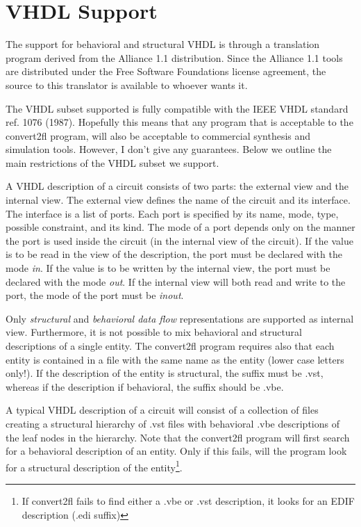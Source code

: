 \section{VHDL Support}
\label{VHDL}

The support for behavioral and structural VHDL%
%
{} is through a translation
program derived from the Alliance%
%
{} 1.1 distribution. 
Since the Alliance 1.1 tools are distributed under the Free Software
Foundations license agreement, the source to this translator is
available to whoever wants it.

The VHDL subset supported is fully compatible with the IEEE VHDL standard
ref. 1076 (1987).
Hopefully this means that any program that is acceptable to the convert2fl%
%
{}
program, will also be acceptable to commercial synthesis and simulation tools. 
However, I don't give any guarantees.
Below we outline the main restrictions of the VHDL subset we support.

A VHDL description of a circuit consists of two parts:
the external view and the internal view.
The external view defines the name of the circuit and its interface.
The interface is a list of ports.
Each port is specified by its name, mode, type, possible constraint, and its
kind.
The mode of a port depends only on the manner the port is used inside the
circuit (in the internal view of the circuit).
If the value is to be read in the view of the description, the port must
be declared with the mode {\em in}.
If the value is to be written by the internal view, the port must
be declared with the mode {\em out}.
If the internal view will both read and write to the port, the mode of the
port must be {\em inout}.

Only {\em structural} and {\em behavioral data flow} representations
are supported as internal view.
Furthermore, it is not possible to mix behavioral and structural
descriptions of a single entity.
The convert2fl program requires also that each entity is contained in
a file with the same name as the entity (lower case letters only!).
If the description of the entity is structural, the suffix must be .vst,
whereas if the description if behavioral, the suffix should be .vbe.

A typical VHDL description of a circuit will consist of a collection
of files creating a structural hierarchy of .vst files with behavioral
.vbe descriptions of the leaf nodes in the hierarchy.
Note that the convert2fl program will first search for a behavioral
description of an entity.
Only if this fails, will the program look for a structural description
of the entity\footnote{If convert2fl fails to find either a .vbe or .vst
description, it looks for an EDIF description (.edi suffix)}.

